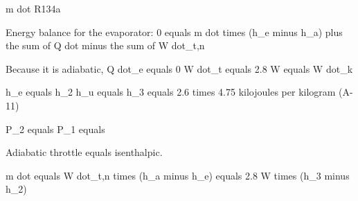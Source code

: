 m dot R134a

Energy balance for the evaporator:
0 equals m dot times (h_e minus h_a) plus the sum of Q dot minus the sum of W dot_t,n

Because it is adiabatic, Q dot_e equals 0
W dot_t equals 2.8 W equals W dot_k

h_e equals h_2
h_u equals h_3 equals 2.6 times 4.75 kilojoules per kilogram (A-11)

P_2 equals P_1 equals

Adiabatic throttle equals isenthalpic.

m dot equals W dot_t,n times (h_a minus h_e) equals 2.8 W times (h_3 minus h_2)